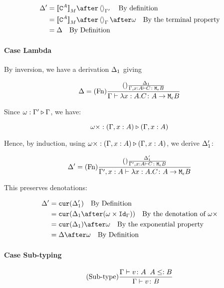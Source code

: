 {    \begin{align}
        \D' & = \deno{\const{A}} \after \term{\G'}\qt{By definition}\\
        & = \deno{\const{A}} \after \term{\G}\after \w \qt{By the terminal property}\\
        & = \D\qt{By Definition}\\
    \end{align}


    \paragraph{Case Lambda}
    By inversion, we have a derivation $\Delta_1$ giving

    \begin{equation}
        \Delta = (\text{Fn}) \frac{
            (\text{}) \frac{\Delta_1}{\Gamma, x: A \vdash C \colon \texttt{M}_{\epsilon}{B}}
        }{\Gamma \vdash \lambda x : A. C \colon A \rightarrow \texttt{M}_{\epsilon}{B}}
    \end{equation}

    Since $\omega : \Gamma' \triangleright \Gamma$, we have:

    \begin{equation}
        \omega\times : (\Gamma,x:  A) \triangleright (\Gamma, x: A)
    \end{equation}

    Hence, by induction, using $\omega\times : (\Gamma,x:  A) \triangleright (\Gamma, x: A)$, we derive $\Delta_1'$:

    \begin{equation}
        \Delta' = (\text{Fn}) \frac{
            (\text{}) \frac{\Delta_1'}{\Gamma',x: A \vdash C \colon \texttt{M}_{\epsilon}{B}}
        }{\Gamma',x: A \vdash \lambda x : A. C \colon A \rightarrow \texttt{M}_{\epsilon}{B}}
    \end{equation}

    This preserves denotations:


    \begin{align}
    \D' & = \cur{\D_1'} \qt{By Definition}\\
    & = \cur{\D_1\after(\w\times \idg)}\qt{By the denotation of $\w\x$} \\
    &= \cur{\D_1}\after\w\qt{By the exponential property}\\
    &= \D\after \w \qt{By Definition}
    \end{align}


    \paragraph{Case Sub-typing}

    \begin{equation}
        (\text{Sub-type}) \frac{\Gamma \vdash v \colon A\;\; A\leq: B}{\Gamma \vdash v \colon B}
    \end{equation}

}
